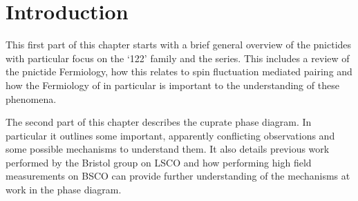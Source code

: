
\chapter{Introduction}




\begin{chapterabstract}
This first part of this chapter starts with a brief general overview of the pnictides with particular focus on the `122' family and the \BaFePAs series. This includes a review of the pnictide Fermiology, how this relates to spin fluctuation mediated pairing and how the Fermiology of \BaFeP in particular is important to the understanding of these phenomena.

The second part of this chapter describes the cuprate phase diagram. In particular it outlines some important, apparently conflicting observations and some possible mechanisms to understand them. It also details previous work performed by the Bristol group on \acs{LSCO} and how performing high field measurements on \acs{BSCO} can provide further understanding of the mechanisms at work in the phase diagram.
\end{chapterabstract}










